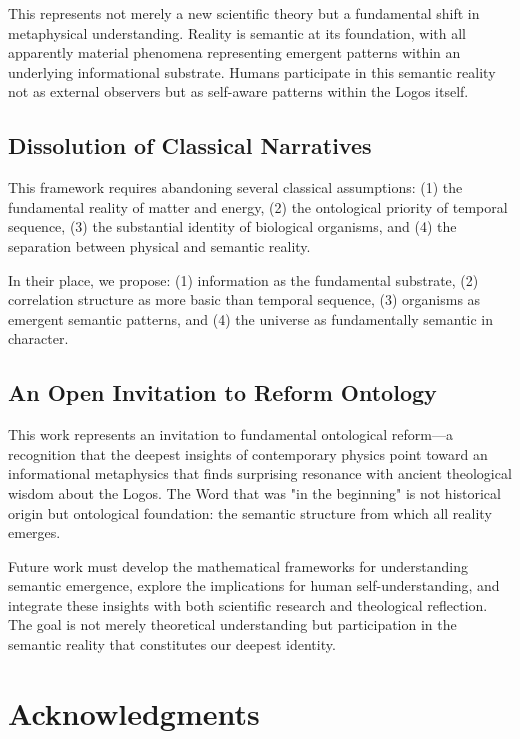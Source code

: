 \documentclass[12pt]{article}
\begin{document}
This represents not merely a new scientific theory but a fundamental shift in metaphysical understanding. Reality is semantic at its foundation, with all apparently material phenomena representing emergent patterns within an underlying informational substrate. Humans participate in this semantic reality not as external observers but as self-aware patterns within the Logos itself.

\subsection{Dissolution of Classical Narratives}

This framework requires abandoning several classical assumptions: (1) the fundamental reality of matter and energy, (2) the ontological priority of temporal sequence, (3) the substantial identity of biological organisms, and (4) the separation between physical and semantic reality.

In their place, we propose: (1) information as the fundamental substrate, (2) correlation structure as more basic than temporal sequence, (3) organisms as emergent semantic patterns, and (4) the universe as fundamentally semantic in character.

\subsection{An Open Invitation to Reform Ontology}

This work represents an invitation to fundamental ontological reform—a recognition that the deepest insights of contemporary physics point toward an informational metaphysics that finds surprising resonance with ancient theological wisdom about the Logos. The Word that was "in the beginning" is not historical origin but ontological foundation: the semantic structure from which all reality emerges.

Future work must develop the mathematical frameworks for understanding semantic emergence, explore the implications for human self-understanding, and integrate these insights with both scientific research and theological reflection. The goal is not merely theoretical understanding but participation in the semantic reality that constitutes our deepest identity.

\section*{Acknowledgments}
\end{document}
